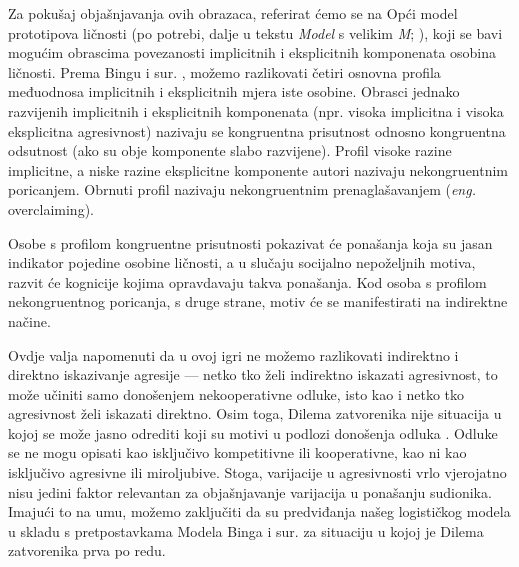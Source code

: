 \documentclass[a4paper, 12pt]{report}
\begin{document}
Za pokušaj objašnjavanja ovih obrazaca, referirat ćemo se na 
Opći model prototipova ličnosti (po potrebi, dalje u tekstu \emph{Model} s
velikim \emph{M}; \citealp{bing2007integrating}), koji se bavi 
mogućim obrascima povezanosti implicitnih i eksplicitnih komponenata osobina
ličnosti.
Prema Bingu i sur. \citeyearpar{bing2007integrating}, možemo razlikovati četiri osnovna profila
međuodnosa implicitnih i eksplicitnih mjera iste osobine. Obrasci jednako
razvijenih
implicitnih i eksplicitnih komponenata (npr. visoka implicitna i
visoka eksplicitna agresivnost) nazivaju se kongruentna prisutnost odnosno
kongruentna odsutnost (ako su obje komponente slabo razvijene). 
Profil visoke razine implicitne, a niske
razine eksplicitne komponente autori nazivaju nekongruentnim poricanjem. Obrnuti profil
nazivaju nekongruentnim prenaglašavanjem (\emph{eng.} overclaiming). 

Osobe s profilom kongruentne prisutnosti pokazivat
će ponašanja koja su jasan indikator pojedine osobine ličnosti, a u slučaju
socijalno nepoželjnih motiva, razvit će kognicije kojima opravdavaju takva
ponašanja. Kod osoba s profilom nekongruentnog poricanja, s druge strane, motiv
će se manifestirati na indirektne načine. 

Ovdje valja
napomenuti da u ovoj igri ne možemo razlikovati indirektno i direktno
iskazivanje agresije --- netko tko želi indirektno iskazati agresivnost, to može
učiniti samo donošenjem nekooperativne odluke, isto kao i netko tko agresivnost želi
iskazati direktno.
Osim toga, Dilema zatvorenika nije situacija u
kojoj se može jasno odrediti koji su motivi u podlozi donošenja odluka \citep{colgt}.
Odluke se ne mogu opisati kao isključivo kompetitivne ili kooperativne, kao ni
kao isključivo agresivne ili miroljubive. Stoga, varijacije u agresivnosti
vrlo vjerojatno nisu jedini faktor relevantan za objašnjavanje varijacija u
ponašanju sudionika. 
Imajući to na umu, možemo
zaključiti da su predviđanja našeg logističkog modela u skladu s pretpostavkama 
Modela Binga i sur. \citeyearpar{bing2007integrating}
za situaciju u kojoj je Dilema zatvorenika prva po redu. 
\end{document}
